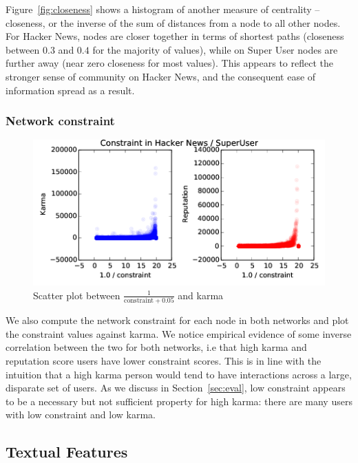 \documentclass[11pt]{article}
\begin{document}
Figure~\ref{fig:closeness} shows a histogram of another measure of centrality --
closeness, or the inverse of the sum of distances from a node to all other
nodes. For Hacker News, nodes are closer together in terms of shortest paths 
(closeness between $0.3$ and $0.4$ for the majority of values), while on Super User nodes
are further away (near zero closeness for most values). This appears to reflect
the stronger sense of community on Hacker News, and the consequent ease of
information spread as a result.

\subsubsection{Network constraint}
\label{sec:constraint}

\begin{figure}[h]
\centering
\includegraphics[width=\linewidth]{constraint_correlation-png}
\caption{Scatter plot between $\frac{1}{\text{constraint} + 0.05}$ and karma}
\end{figure}

We also compute the network constraint for each node in both networks and plot
the constraint values against karma. We notice empirical evidence of some 
inverse correlation between the two for both networks, i.e that high karma and
reputation score users have lower constraint scores. This is in line with the
intuition that a high karma person would tend to have interactions across a
large, disparate set of users. As we discuss in Section~\ref{sec:eval}, low constraint
appears to be a necessary but not sufficient property for high karma: there are
many users with low constraint and low karma.

\subsection{Textual Features}
\end{document}
